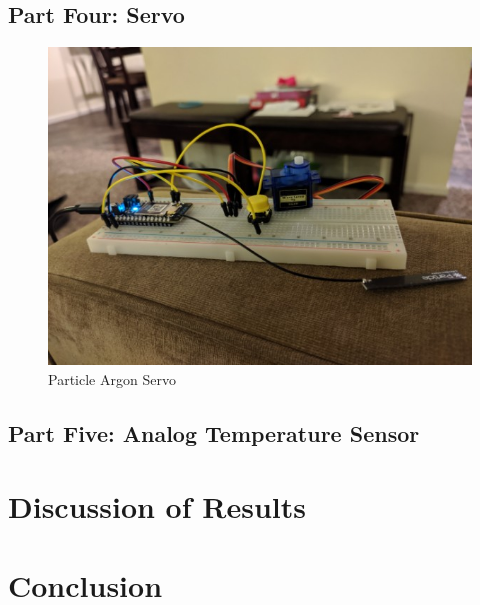 \documentclass{article}
\begin{document}
\subsection{Part Four: Servo}
\begin{figure}[H]
\center
\includegraphics[width=\textwidth]{images/servo.jpeg}
\caption{Particle Argon Servo}
\label{fig:servo}
\end{figure}



\subsection{Part Five: Analog Temperature Sensor}


\section{Discussion of Results}


\section{Conclusion}
\end{document}

